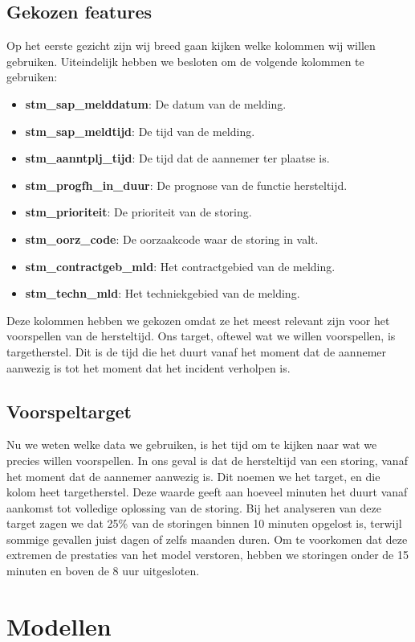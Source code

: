 \documentclass{article}
\begin{document}
\subsection{Gekozen features}
Op het eerste gezicht zijn wij breed gaan kijken welke kolommen wij willen gebruiken. Uiteindelijk hebben we besloten om de volgende kolommen te gebruiken:
\begin{itemize}
  \item \textbf{stm\_sap\_melddatum}: De datum van de melding.
  \item \textbf{stm\_sap\_meldtijd}: De tijd van de melding.
  \item \textbf{stm\_aanntplj\_tijd}: De tijd dat de aannemer ter plaatse is. 
  \item \textbf{stm\_progfh\_in\_duur}: De prognose van de functie hersteltijd.
  \item \textbf{stm\_prioriteit}: De prioriteit van de storing.
  \item \textbf{stm\_oorz\_code}: De oorzaakcode waar de storing in valt.
  \item \textbf{stm\_contractgeb\_mld}: Het contractgebied van de melding.
  \item \textbf{stm\_techn\_mld}: Het techniekgebied van de melding.
\end{itemize}
Deze kolommen hebben we gekozen omdat ze het meest relevant zijn voor het voorspellen van de hersteltijd. Ons target, oftewel wat we willen voorspellen, is targetherstel. Dit is de tijd die het duurt vanaf het moment dat de aannemer aanwezig is tot het moment dat het incident verholpen is.

\subsection{Voorspeltarget}
Nu we weten welke data we gebruiken, is het tijd om te kijken naar wat we precies willen voorspellen. In ons geval is dat de hersteltijd van een storing, vanaf het moment dat de aannemer aanwezig is. Dit noemen we het target, en die kolom heet targetherstel. Deze waarde geeft aan hoeveel minuten het duurt vanaf aankomst tot volledige oplossing van de storing. Bij het analyseren van deze target zagen we dat 25\% van de storingen binnen 10 minuten opgelost is, terwijl sommige gevallen juist dagen of zelfs maanden duren. Om te voorkomen dat deze extremen de prestaties van het model verstoren, hebben we storingen onder de 15 minuten en boven de 8 uur uitgesloten.

\newpage
\section{Modellen}
\end{document}
